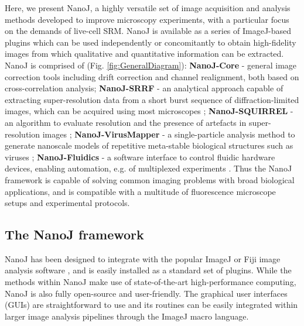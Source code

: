 
 Here, we present NanoJ, a highly versatile set of image acquisition and analysis methods developed to improve microscopy experiments, with a particular focus on the demands of live-cell SRM. NanoJ is available as a series of ImageJ-based plugins which can be used independently or concomitantly to obtain high-fidelity images from which qualitative and quantitative information can be extracted. NanoJ is comprised of (Fig. \ref{fig:GeneralDiagram}): \textbf{NanoJ-Core} - general image correction tools including drift correction and channel realignment, both based on cross-correlation analysis; \textbf{NanoJ-SRRF} - an analytical approach capable of extracting super-resolution data from a short burst sequence of diffraction-limited images, which can be acquired using most microscopes \cite{gustafsson2016fast,culley2018srrf}; \textbf{NanoJ-SQUIRREL} - an algorithm to evaluate resolution and the presence of artefacts in super-resolution images \cite{culley2018quantitative}; \textbf{NanoJ-VirusMapper} - a single-particle analysis method to generate nanoscale models of repetitive meta-stable biological structures such as viruses \cite{gray2016virusmapper,gray2017open,gray2018nanoscale}; \textbf{NanoJ-Fluidics} - a software interface to control fluidic hardware devices, enabling automation, e.g. of multiplexed experiments \cite{almada2018automating}. Thus the NanoJ framework is capable of solving common imaging problems with broad biological applications, and is compatible with a multitude of fluorescence microscope setups and experimental protocols. 
 
\subsection*{The NanoJ framework}
 NanoJ has been designed to integrate with the popular ImageJ or Fiji image analysis software \cite{abramoff2004image,schindelin2012fiji}, and is easily installed as a standard set of plugins. While the methods within NanoJ make use of state-of-the-art high-performance computing, NanoJ is also fully open-source and user-friendly. The graphical user interfaces (GUIs) are straightforward to use and its routines can be easily integrated within larger image analysis pipelines through the ImageJ macro language.

